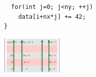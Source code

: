 \begin{frame}[fragile=singleslide]
\begin{columns}
\begin{column}{0.48\textwidth}
{\begin{verbatim}
  for(int j=0; j<ny; ++j)
    data[i+nx*j] += 42;
}
\end{verbatim}
}
      \begin{center}

        \includegraphics[width=3cm]{tikz/row-major-cuda}

      \end{center}

    \end{column}
    \hfill
  \end{columns}
\end{frame}



